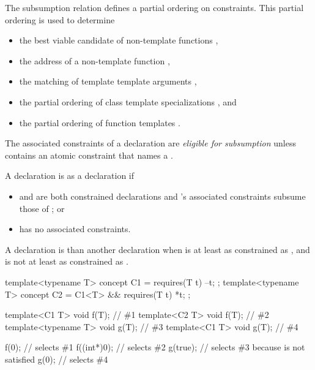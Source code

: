 \documentclass{wg21}
\begin{document}
\pnum
\begin{note}
The subsumption relation defines a partial ordering on constraints.
This partial ordering is used to determine
\begin{itemize}
    \item the best viable candidate of non-template functions ,
    \item the address of a non-template function ,
    \item the matching of template template arguments ,
    \item the partial ordering of class template specializations , and
    \item the partial ordering of function templates .
\end{itemize}
\end{note}

\begin{addedblock}

The associated constraints  of a declaration  are \emph{eligible for subsumption}
unless  contains an atomic constraint that names a  .

\end{addedblock}


\pnum
A declaration  is
 as
a declaration  if
\begin{itemize}
    \item {} and  are both constrained declarations and
    's associated constraints
     subsume those of ; or

    \item {} has no associated constraints.
\end{itemize}

\pnum
A declaration  is 
than another declaration  when  is at least as
constrained as , and  is not at least as
constrained as .
\begin{example}
\begin{codeblock}
    template<typename T> concept C1 = requires(T t) { --t; };
    template<typename T> concept C2 = C1<T> && requires(T t) { *t; };

    template<C1 T> void f(T);       // \#1
    template<C2 T> void f(T);       // \#2
    template<typename T> void g(T); // \#3
    template<C1 T> void g(T);       // \#4

    f(0);                           // selects \#1
    f((int*)0);                     // selects \#2
    g(true);                        // selects \#3 because  is not satisfied
    g(0);                           // selects \#4
\end{codeblock}
\end{example}
\end{document}
